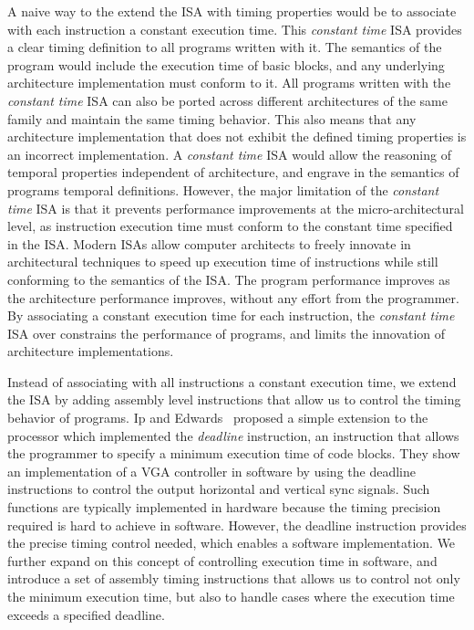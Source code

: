 A naive way to the extend the ISA with timing properties would be to associate with each instruction a constant execution time. 
This \emph{constant time} ISA provides a clear timing definition to all programs written with it.
The semantics of the program would include the execution time of basic blocks, and any underlying architecture implementation must conform to it.
All programs written with the \emph{constant time} ISA can also be ported across different architectures of the same family and maintain the same timing behavior.
This also means that any architecture implementation that does not exhibit the defined timing properties is an incorrect implementation.
A \emph{constant time} ISA would allow the reasoning of temporal properties independent of architecture, and engrave in the semantics of programs temporal definitions.     
However, the major limitation of the \emph{constant time} ISA is that it prevents performance improvements at the micro-architectural level, as instruction execution time must conform to the constant time specified in the ISA.
Modern ISAs allow computer architects to freely innovate in architectural techniques to speed up execution time of instructions while still conforming to the semantics of the ISA.  
The program performance improves as the architecture performance improves, without any effort from the programmer. 
By associating a constant execution time for each instruction, the \emph{constant time} ISA over constrains the performance of programs, and limits the innovation of architecture implementations.    

Instead of associating with all instructions a constant execution time, we extend the ISA by adding assembly level instructions that allow us to control the timing behavior of programs. 
Ip and Edwards~\cite{ip2006processor} proposed a simple extension to the processor which implemented the \emph{deadline} instruction, an instruction that allows the programmer to specify a minimum execution time of code blocks.
They show an implementation of a VGA controller in software by using the deadline instructions to control the output horizontal and vertical sync signals.
Such functions are typically implemented in hardware because the timing precision required is hard to achieve in software.
However, the deadline instruction provides the precise timing control needed, which enables a software implementation.  
We further expand on this concept of controlling execution time in software, and introduce a set of assembly timing instructions that allows us to 
control not only the minimum execution time, but also to handle cases where the execution time exceeds a specified deadline.

